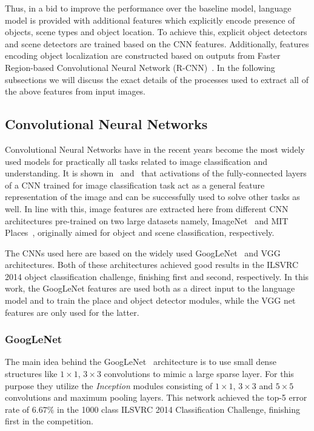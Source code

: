 Thus, in a bid to improve the performance over the baseline model, language
model is provided with additional features which explicitly encode presence
of objects, scene types and object location.
To achieve this, explicit object detectors and scene detectors are trained based
on the CNN features.
Additionally, features encoding object localization are constructed based on
outputs from Faster Region-based Convolutional Neural Network
(R-CNN)~\cite{ren15fasterrcnn}.
In the following subsections we will discuss the exact details of the processes
used to extract all of the above features from input images. 
\subsection{Convolutional Neural Networks}
Convolutional Neural Networks have in the recent years become the most widely
used models for practically all tasks related to image classification and
understanding.
It is shown in~\cite{Donahue2014} and~\cite{Razavian2014CVPR} that activations
of the fully-connected layers of a CNN trained for image classification task act
as a general feature representation of the image and can be successfully used to
solve other tasks as well.
In line with this, image features are extracted here from different CNN
architectures pre-trained on two large datasets namely,
ImageNet~\cite{ImagenetOrig} and MIT Places~\cite{Zhou2014NIPS}, originally
aimed for object and scene classification, respectively.

The CNNs used here are based on the widely used
GoogLeNet~\cite{DBLP:journals/corr/SzegedyLJSRAEVR14} and VGG~\cite{Simonyan14c}
architectures. 
Both of these architectures achieved good results in the ILSVRC 2014 object
classification challenge, finishing first and second, respectively.
In this work, the GoogLeNet features are used both as a direct input to the
language model and to train the place and object detector modules, while the VGG
net features are only used for the latter.

\subsubsection{GoogLeNet} 
\label{subsec:gCNN}
The main idea behind the GoogLeNet~\cite{DBLP:journals/corr/SzegedyLJSRAEVR14}
architecture is to use small dense structures like $1\times1$, $3\times3$
convolutions to mimic a large sparse layer.
For this purpose they utilize the \emph{Inception} modules consisting of
$1\times1$, $3\times3$ and $5\times5$ convolutions and maximum pooling layers.
This network achieved the top-5 error rate of $6.67\%$ in the 1000 class ILSVRC
2014 Classification Challenge, finishing first in the competition.

